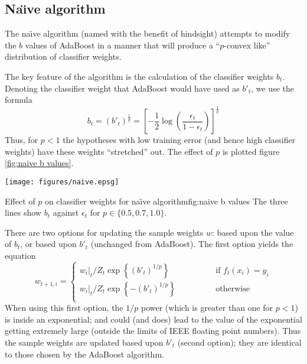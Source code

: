 \subsection{Na\"{\i}ve algorithm}

The na\"{\i}ve algorithm (named with the benefit of hindsight) attempts to
modify the $b$ values of AdaBoost in a manner that will produce a
``$p$-convex like'' distribution of classifier weights.

The key feature of the algorithm is the calculation of the classifier
weights $b_t$.  Denoting the classifier weight that AdaBoost would have
used as $b'_t$, we use the formula
%
\begin{equation}
b_t = (b'_t)^{\frac{1}{p}} = \left[ - \frac{1}{2} \log \left
( \frac{\epsilon_t}{1 - \epsilon_t} \right) \right]^\frac{1}{p}
\end{equation}
%
Thus, for $p < 1$ the hypotheses with low training error (and hence
high classifier weights) have these weights ``stretched'' out.  The
effect of $p$ is plotted figure \ref{fig:naive b values}.

\begin{linefigure}
\begin{center}
\texttt{[image: figures/naive.epsg]}
\end{center}
\begin{capt}{Effect of $p$ on classifier weights for na\"{\i}ve
algorithm}{fig:naive b values} 
The three lines show $b_t$ against $\epsilon_t$ for $p \in \{ 0.5,
0.7, 1.0 \}$.
\end{capt}
\end{linefigure}

There are two options for updating the sample weights $w$: based upon
the value of $b_t$, or based upon $b'_t$ (unchanged from AdaBoost).
The first option yields the equation
%
\begin{equation}
w_{t+1,i} = \left\{
\begin{array}{cl}
	w_i|_t / Z_t \exp \left\{ (b'_t)^{1/p} \right\} & \qquad \qquad \mbox{if
	$f_t(x_i) = y_i$} \\
	w_i|_t / Z_t \exp \left\{ -(b'_t)^{1/p} \right\} 	& \qquad \qquad
	\mbox{otherwise} \\
\end{array} \right.
\end{equation}
%
When using this first option, the $1/p$ power (which is
greater than one for $p < 1$) is inside an exponential; and could
(and does) lead to the value of the exponential getting extremely
large (outside the limits of IEEE floating point numbers).  Thus the
sample weights are updated based upon $b'_t$ (second option); they are
identical to those chosen by the AdaBoost algorithm.

